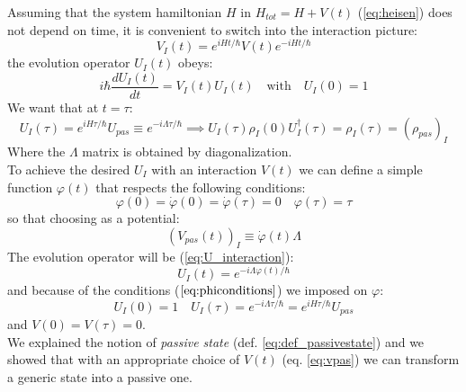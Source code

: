 \documentclass[12pt,a4paper]{book}
\theoremstyle{definition}
\begin{document}

Assuming that the system hamiltonian $H$ in $H_{tot}=H+V(t)$ (\ref{eq:heisen}) does not depend on time, it is convenient to switch into the interaction picture:
\begin{equation}
	V_I(t)=e^{i H t / \hbar}  V(t) e^{-i H t / \hbar}
\end{equation}
the evolution operator $U_I(t)$ obeys:
\begin{equation}\label{eq:U_interaction}
	i \hbar \frac{d U_{I}(t)}{d t}=V_I(t) U_{I}(t) \quad \text{with} \quad U_I(0)=1
\end{equation}
We want that at  $t=\tau$:
\begin{equation}
	U_{I}(\tau) = e^{i H \tau / \hbar} U_{pas}\equiv e^{-i \Lambda \tau / \hbar} \implies  U_I(\tau) \rho_I(0) U_I^\dagger(\tau)=\rho_I(\tau)=(\rho_{pas})_I
\end{equation}
Where the  $\Lambda$ matrix is obtained by diagonalization.\\
To achieve the desired $U_I$ with an interaction $V(t)$ we can define a simple function $\varphi(t)$  that respects the following conditions:
\begin{equation}\label{eq:phiconditions}
\varphi(0)=\dot{\varphi}(0)=\dot{\varphi}(\tau)=0 \quad \varphi(\tau)=\tau
\end{equation}
so that choosing as a potential:
\begin{equation}\label{eq:vpas}
	(V_{pas}(t))_I\equiv \dot{\varphi}(t)  \Lambda 
\end{equation}
The evolution operator will be (\ref{eq:U_interaction}):
\begin{equation}
	U_{I}(t)=e^{-i \Lambda \varphi(t) / \hbar}
\end{equation}
and because of the conditions ($\ref{eq:phiconditions}$) we imposed on $\varphi$:
\begin{equation}
	U_{I}(0)=1 \quad 	U_{I}(\tau) = e^{-i \Lambda \tau / \hbar}=e^{i H \tau / \hbar} U_{pas}
\end{equation}
and $V(0)=V(\tau)=0$.\\
We explained the notion of \textit{passive state} (def. \ref{eq:def_passivestate}) and we showed that with an appropriate choice of $V(t)$ (eq. \ref{eq:vpas}) we can transform a generic state into a passive one.\\
\end{document}
